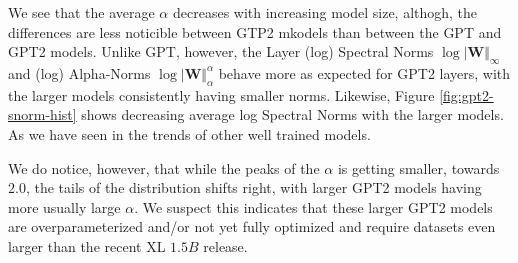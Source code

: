 We see that the average $\alpha$ decreases with increasing model size,
althogh, the differences are less noticible between GTP2 mkodels than between the GPT and GPT2 models.
Unlike GPT, however, the Layer (log) Spectral Norms $\log\vert\mathbf{W}\Vert_{\infty}$ 
and (log) Alpha-Norms $\log\vert\mathbf{W}\Vert_{\alpha}^{\alpha}$
behave more as expected for GPT2 layers, with the larger models  consistently having  smaller norms. 
Likewise, Figure \ref{fig:gpt2-snorm-hist} shows decreasing average log Spectral Norms
with the larger models.   As we have seen in the trends of other well trained models.

We do notice, however, that while the peaks of the $\alpha$ is getting smaller, towards $2.0$,
the tails of the distribution shifts right, with larger GPT2 models having more
usually large $\alpha$.  We suspect this indicates that these larger GPT2 models are 
overparameterized and/or not yet fully optimized and require datasets even larger
than the recent XL $1.5B$ release\cite{gpt2-xl}.

